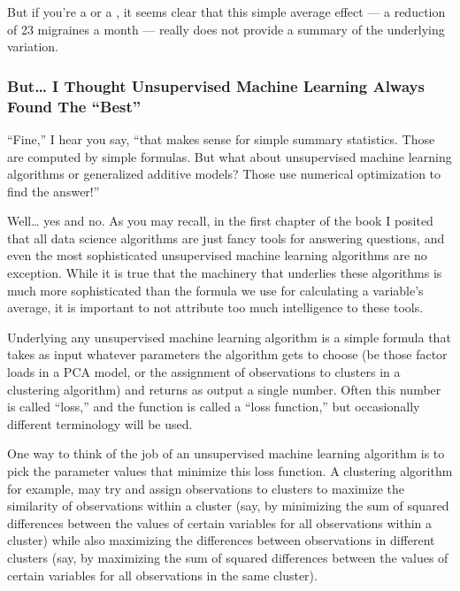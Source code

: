 \documentclass[letterpaper,10pt,english]{jupyterBook}
\begin{document}
\sphinxAtStartPar
But if you’re a  or a , it seems clear that this simple average effect — a reduction of 2\sphinxhyphen{}3 migraines a month — really does not provide a  summary of the underlying variation.


\subsubsection{But… I Thought Unsupervised Machine Learning Always Found The “Best”}
\label{\detokenize{30_questions/18_exploratory_internal_faithful:but-i-thought-unsupervised-machine-learning-always-found-the-best}}
\sphinxAtStartPar
“Fine,” I hear you say, “that makes sense for simple summary statistics. Those are computed by simple formulas. But what about unsupervised machine learning algorithms or generalized additive models? Those use numerical optimization to find the  answer!”

\sphinxAtStartPar
Well… yes and no. As you may recall, in the first chapter of the book I posited that all data science algorithms are just fancy tools for answering questions, and even the most sophisticated unsupervised machine learning algorithms are no exception. While it is true that the machinery that underlies these algorithms is much more sophisticated than the formula we use for calculating a variable’s average, it is important to not attribute too much intelligence to these tools.

\sphinxAtStartPar
Underlying any unsupervised machine learning algorithm is a simple formula that takes as input whatever parameters the algorithm gets to choose (be those factor loads in a PCA model, or the assignment of observations to clusters in a clustering algorithm) and returns as output a single number. Often this number is called “loss,” and the function is called a “loss function,” but occasionally different terminology will be used.

\sphinxAtStartPar
One way to think of the job of an unsupervised machine learning algorithm is to pick the parameter values that minimize this loss function. A clustering algorithm for example, may try and assign observations to clusters to maximize the similarity of observations within a cluster (say, by minimizing the sum of squared differences between the values of certain variables for all observations within a cluster) while also maximizing the differences between observations in different clusters (say, by maximizing the sum of squared differences between the values of certain variables for all observations  in the same cluster).
\end{document}
